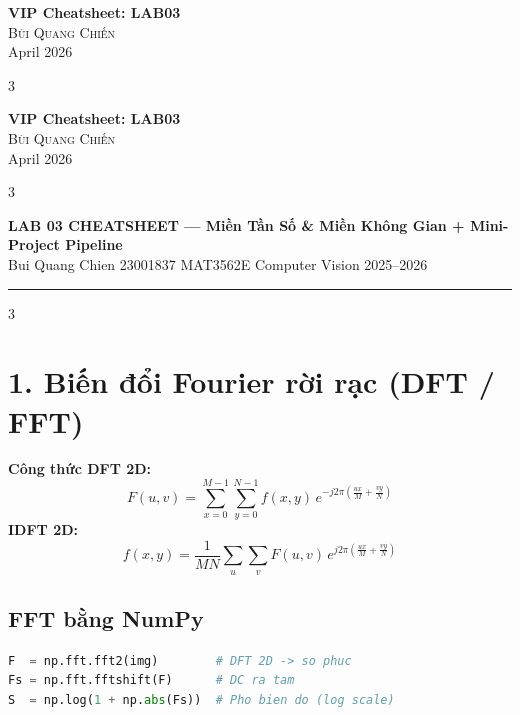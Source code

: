 \documentclass[9pt,landscape,a4paper]{extarticle}
\begin{document}
\begin{center}
    {\Large \bfseries VIP Cheatsheet: LAB03} \\
    \vspace{0.3cm}
    {\large \textsc{Bùi Quang Chiến}} \\
    \vspace{0.2cm}
    {\small April 2026}
\end{center}
\vspace{0.3cm}

\begin{multicols*}{3}

\begin{center}
    {\Large \bfseries VIP Cheatsheet: LAB03} \\
    \vspace{0.3cm}
    {\large \textsc{Bùi Quang Chiến}} \\
    \vspace{0.2cm}
    {\small April 2026}
\end{center}
\vspace{0.3cm}

\begin{multicols*}{3}

\begin{center}
  {\large\bfseries\color{hdr} LAB 03 CHEATSHEET --- Miền Tần Số \& Miền Không Gian + Mini-Project Pipeline} \\[1pt]
  {\small Bui Quang Chien \textbullet{} 23001837 \textbullet{} MAT3562E Computer Vision 2025--2026}
\end{center}
\hrule\vspace{2pt}

\begin{multicols}{3}

\section{1. Biến đổi Fourier rời rạc (DFT / FFT)}

\textbf{Công thức DFT 2D:}
\[
  F(u,v) = \sum_{x=0}^{M-1}\sum_{y=0}^{N-1} f(x,y)\, e^{-j2\pi\!\left(\frac{ux}{M}+\frac{vy}{N}\right)}
\]
\textbf{IDFT 2D:}
\[
  f(x,y) = \frac{1}{MN}\sum_{u}\sum_{v} F(u,v)\, e^{j2\pi\!\left(\frac{ux}{M}+\frac{vy}{N}\right)}
\]

\subsection{FFT bằng NumPy}
\begin{lstlisting}[language=Python]
F  = np.fft.fft2(img)        # DFT 2D -> so phuc
Fs = np.fft.fftshift(F)      # DC ra tam
S  = np.log(1 + np.abs(Fs))  # Pho bien do (log scale)
\end{lstlisting}


\end{multicols}
\end{multicols*}
\end{multicols*}
\end{document}
